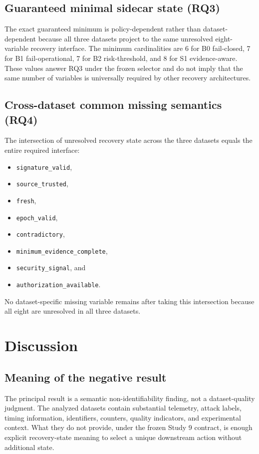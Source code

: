 \documentclass[preprint,12pt]{elsarticle}
\begin{document}
\subsection{Guaranteed minimal sidecar state (RQ3)}

The exact guaranteed minimum is policy-dependent rather than dataset-dependent because all three datasets project to the same unresolved eight-variable recovery interface. The minimum cardinalities are 6 for B0 fail-closed, 7 for B1 fail-operational, 7 for B2 risk-threshold, and 8 for S1 evidence-aware. These values answer RQ3 under the frozen selector and do not imply that the same number of variables is universally required by other recovery architectures.

\subsection{Cross-dataset common missing semantics (RQ4)}

The intersection of unresolved recovery state across the three datasets equals the entire required interface:
\begin{itemize}[nosep,leftmargin=*]
    \item \texttt{signature\_valid},
    \item \texttt{source\_trusted},
    \item \texttt{fresh},
    \item \texttt{epoch\_valid},
    \item \texttt{contradictory},
    \item \texttt{minimum\_evidence\_complete},
    \item \texttt{security\_signal}, and
    \item \texttt{authorization\_available}.
\end{itemize}
No dataset-specific missing variable remains after taking this intersection because all eight are unresolved in all three datasets.

\section{Discussion}

\subsection{Meaning of the negative result}

The principal result is a semantic non-identifiability finding, not a dataset-quality judgment. The analyzed datasets contain substantial telemetry, attack labels, timing information, identifiers, counters, quality indicators, and experimental context. What they do not provide, under the frozen Study 9 contract, is enough explicit recovery-state meaning to select a unique downstream action without additional state.
\end{document}
